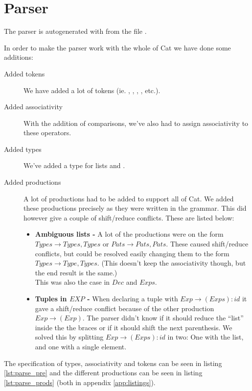 \chapter{Parser}
The parser is autogenerated with  from the file 
.

In order to make the parser work with the whole of Cat we have done some
additions:

\begin{description}
\item [Added tokens] We have added a lot of tokens (ie. ,
        , , , etc.).
\item [Added associativity] With the addition of comparisons, we've also had
        to assign associativity to these operators.
\item [Added types] We've added a type for  lists and
        .
\item [Added productions] A lot of productions had to be added to support all
        of Cat. We added these productions precisely as they were written in
        the grammar. This did however give a couple of shift/reduce conflicts.
        These are listed below:
        \begin{itemize}
        \item \textbf{Ambiguous lists -} A lot of the productions were on the
                form $Types \to Types , Types$ or $Pats \to Pats , Pats$.
                These caused shift/reduce conflicts, but could be resolved
                easily changing them to the form $Types \to Type , Types$.
                (This doesn't keep the associativity though, but the end result
                is the same.)\\
                This was also the case in $Dec$ and $Exps$.
        \item \textbf{Tuples in $EXP$ -} When declaring a tuple with
                $Exp \to ( Exps ) : id$ it gave a shift/reduce conflict because
                of the other production $Exp\to ( Exp )$. The parser didn't
                know if it should reduce the ``list'' inside the the braces or
                if it should shift the next parenthesis. We solved this by
                splitting $Exp \to ( Exps ) : id$ in two: One with the list,
                and one with a single element.
        \end{itemize}
\end{description}

The specification of types, associativity and tokens can be seen in listing
\ref{lst:parse_pre} and the different productions can be seen in listing
\ref{lst:parse_prods} (both in appendix \ref{app:listings}).
